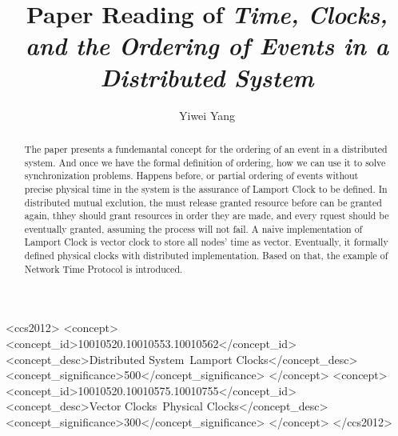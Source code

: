 \documentclass[acmlarge]{acmart}
\begin{document}
\title{Paper Reading of \textit{Time, Clocks, and the Ordering of Events in a Distributed System}}

\author{Yiwei Yang}

\renewcommand{\shortauthors}{Trovato and Tobin, et al.}

\begin{abstract}
  The paper presents a fundemantal concept for the ordering of an event in a distributed system.
  And once we have the formal definition of ordering, how we can use it to solve synchronization
  problems. Happens before, or partial ordering of events without precise physical time in the system
  is the assurance of Lamport Clock to be defined. In distributed mutual exclution, the must release
  granted resource before can be granted again, thhey should grant resources in order they are made, and
  every rquest should be eventually granted, assuming the process will not fail. A naive implementation of
  Lamport Clock is vector clock to store all nodes' time as vector. Eventually, it formally defined physical clocks
  with distributed implementation. Based on that, the example of Network Time Protocol is introduced.
\end{abstract}

\begin{CCSXML}
  <ccs2012>
  <concept>
  <concept_id>10010520.10010553.10010562</concept_id>
  <concept_desc>Distributed System~Lamport Clocks</concept_desc>
  <concept_significance>500</concept_significance>
  </concept>
  <concept>
  <concept_id>10010520.10010575.10010755</concept_id>
  <concept_desc>Vector Clocks~Physical Clocks</concept_desc>
  <concept_significance>300</concept_significance>
  </concept>
  </ccs2012>
\end{CCSXML}
\end{document}
